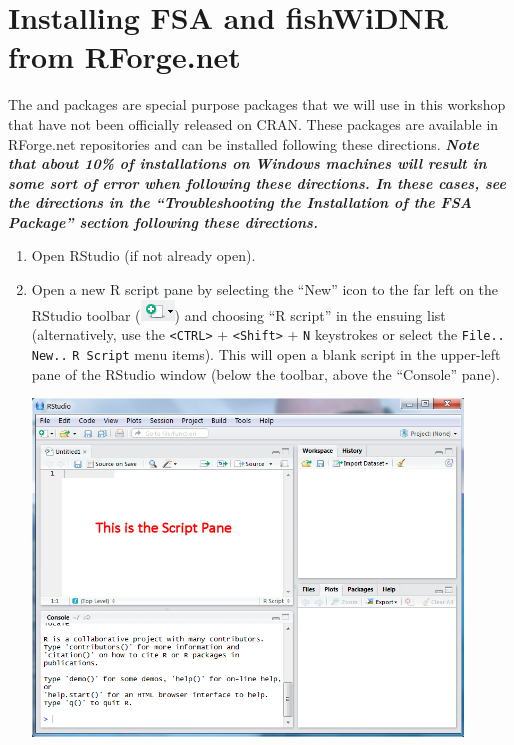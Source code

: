 \documentclass{article}\usepackage[]{graphicx}\usepackage[]{color}
\begin{document}
\newpage
\section{Installing FSA and fishWiDNR from RForge.net}
The  and  packages are special purpose packages that we will use in this workshop that have not been officially released on CRAN.  These packages are available in RForge.net repositories and can be installed following these directions.  \textit{\textbf{Note that about 10\% of installations on Windows machines will result in some sort of error when following these directions.  In these cases, see the directions in the ``Troubleshooting the Installation of the FSA Package'' section following these directions.}}
\begin{enumerate}
  \item Open RStudio (if not already open).

  \item Open a new R script pane by selecting the ``New'' icon to the far left on the RStudio toolbar (\includegraphics[scale=0.8]{Figs/RStudio_Icon_New.png}) and choosing ``R script'' in the ensuing list (alternatively, use the \verb+<CTRL>+ + \verb+<Shift>+ + \verb+N+ keystrokes or select the \verb+File..+ \verb+New..+ \verb+R Script+ menu items).  This will open a blank script in the upper-left pane of the RStudio window (below the toolbar, above the ``Console'' pane).
\begin{center}
  \includegraphics[width=4.5in]{Figs/RStudio_NewScript.png}
\end{center}


\end{enumerate}
\end{document}
